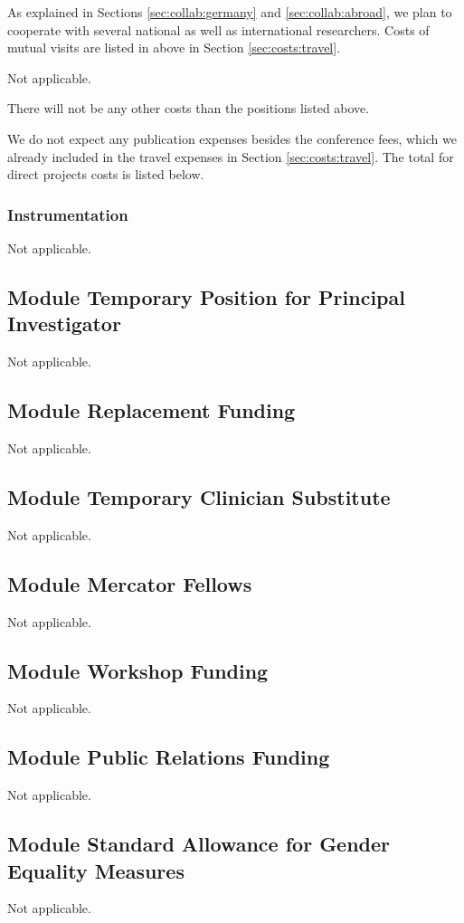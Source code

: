 
As explained in Sections \ref{sec:collab:germany} and \ref{sec:collab:abroad}, we plan to cooperate with several national as well as international researchers. Costs of mutual visits are listed in above in Section \ref{sec:costs:travel}.


Not applicable. 


There will not be any other costs than the positions listed above. 


We do not expect any publication expenses besides the conference fees, which we already included in the travel expenses in Section \ref{sec:costs:travel}. The total for direct projects costs is listed below. 

\subsubsection{Instrumentation}

Not applicable. 

\subsection{Module Temporary Position for Principal Investigator}

Not applicable. 

\subsection{Module Replacement Funding}

Not applicable. 

\subsection{Module Temporary Clinician Substitute}

Not applicable. 

\subsection{Module Mercator Fellows}

Not applicable. 

\subsection{Module Workshop Funding}

Not applicable. 

\subsection{Module Public Relations Funding}

Not applicable. 

\subsection{Module Standard Allowance for Gender Equality Measures}


Not applicable. 